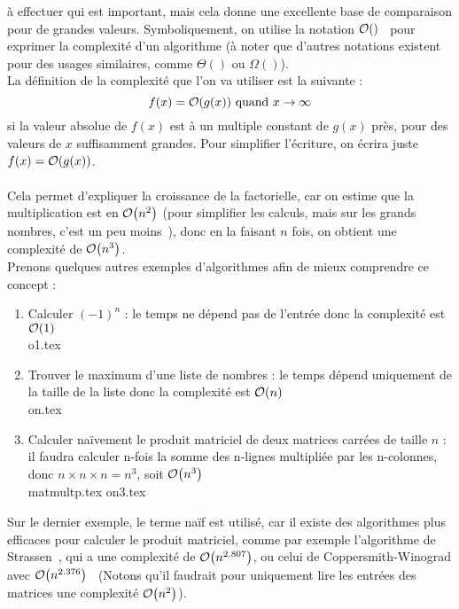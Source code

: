à effectuer qui est important, mais cela donne une  excellente base de comparaison pour de grandes valeurs.
Symboliquement, on utilise la notation $\order{}$~\cite{wiki:big-o} pour exprimer la complexité d'un algorithme (à noter que d'autres
notations existent pour des usages similaires, comme $\Theta()$ ou $\Omega()$).\\
La définition de la complexité que l'on va utiliser est la suivante :
\[ f(x) = \order{g(x)} \text{ quand } x \rightarrow \infty \]
si la valeur absolue de $f(x)$ est à un multiple constant de $g(x)$ près, pour des valeurs de $x$ suffisamment
grandes.
Pour simplifier l'écriture, on écrira juste $f(x) = \order{g(x)}$.\\ \\
Cela permet d'expliquer la croissance de la factorielle, car on estime que la multiplication est en $\order{n^2}$ (pour simplifier les calculs, mais sur les grands nombres, c'est un peu moins~\cite{python-mult-comp}),
donc en la faisant $n$ fois, on obtient une complexité de $\order{n^3}$.\\
Prenons quelques autres exemples d'algorithmes afin de mieux comprendre ce concept :
\begin{enumerate}[wide, labelwidth=!, labelindent=0pt]
\item Calculer $(-1)^n$ : le temps ne dépend pas de l'entrée
donc la complexité est $\order{1}$ \\
{o1.tex}
\item Trouver le maximum d'une liste de nombres : le temps dépend uniquement de la taille de la liste
donc la complexité est $\order{n}$ \\
{on.tex}
\item Calculer naïvement le produit matriciel de deux matrices carrées de taille $n$ : il faudra calculer
n-fois la somme des n-lignes multipliée par les n-colonnes, donc $n \times n \times n = n^3$, soit $\order{n^3}$\\
{matmultp.tex}
{on3.tex}
\end{enumerate}
Sur le dernier exemple, le terme naïf est utilisé, car il existe des algorithmes plus efficaces pour calculer le
produit matriciel, comme par exemple l'algorithme de Strassen~\cite{wiki:matmult}, qui a une complexité de $\order{n^{2.807}}$, ou
celui de Coppersmith-Winograd avec $\order{n^{2.376}}$~\cite{wiki:matmult-copper} (Notons qu'il faudrait pour uniquement lire les entrées
des matrices une complexité $\order{n^2}$).\\ \\
